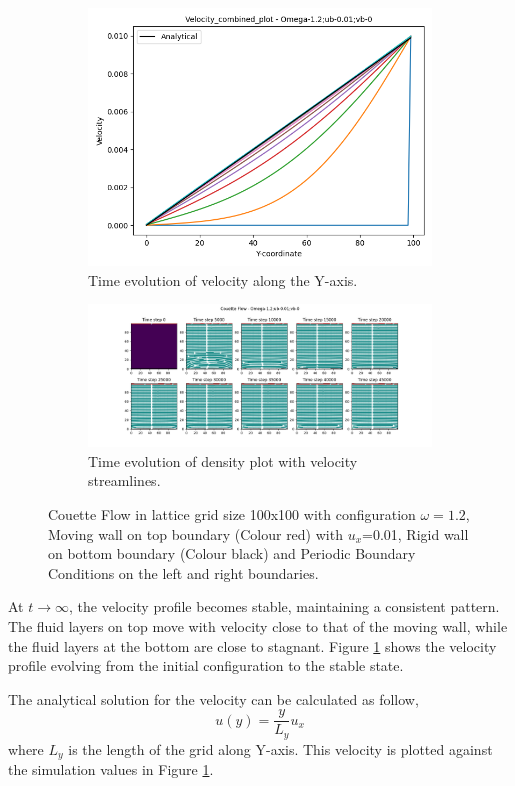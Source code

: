 \documentclass[a4paper,11pt]{report}
\begin{document}
\begin{figure}[h!]
  \begin{subfigure}{\textwidth}
        \centering
        \includegraphics[width=0.4\linewidth]{HPC_report/images/couette/Combined_plot-Y-coordinate-Velocity.png}
        \caption{Time evolution of velocity along the Y-axis.}
        \label{fig:couette_velocity}
    \end{subfigure}
    \begin{subfigure}{\textwidth}
        \includegraphics[width=\linewidth]{HPC_report/images/couette/Streamplot.png}
        \caption{Time evolution of density plot with velocity streamlines.}
    \end{subfigure}
    \caption{Couette Flow in lattice grid size 100x100 with configuration $\omega = 1.2$, Moving wall on top boundary (Colour red) with $u_x$=0.01, Rigid wall on bottom boundary (Colour black) and Periodic Boundary Conditions on the left and right boundaries. }
\end{figure} 

At $t \rightarrow \infty$, the velocity profile becomes stable, maintaining a consistent pattern. The fluid layers on top move with velocity close to that of the moving wall, while the fluid layers at the bottom are close to stagnant. Figure \ref{fig:couette_velocity} shows the velocity profile evolving from the initial configuration to the stable state.

The analytical solution for the velocity can be calculated as follow, \cite{CF_NagyGyrgy2018AGT}
\begin{equation}
    u\left(y\right) = \frac{y}{L_y} u_x
\end{equation}
where $L_y$ is the length of the grid along Y-axis. This velocity is plotted against the simulation values in Figure \ref{fig:couette_velocity}.
\end{document}
